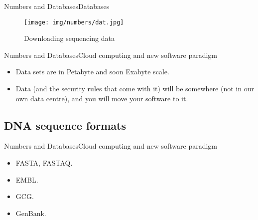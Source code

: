 \documentclass[10pt]{beamer}
\newcommand{\1}{
	\setbeamertemplate{background}{
		\texttt{[image: img/1]}
		\tikz[overlay] \fill[fill opacity=0.75,fill=white] (0,0) rectangle (-\paperwidth,\paperheight);
	}
}
\begin{document}
\begin{frame}{Numbers and Databases}{Databases}
\begin{figure}[]
 \centering
    \texttt{[image: img/numbers/dat.jpg]}
    \label{img:mot2}
    \caption{Downloading sequencing data}
\end{figure}
\end{frame}

\begin{frame}{Numbers and Databases}{Cloud computing and new software paradigm}
\begin{itemize}
\item Data sets are in Petabyte and soon Exabyte scale.
\item Data (and the security rules that come with it) will be somewhere (not in our own data centre), and you will move your software to it.
\end{itemize}
\end{frame}




\subsection{DNA sequence formats}

\begin{frame}{Numbers and Databases}{Cloud computing and new software paradigm}
\begin{itemize}
\item FASTA, FASTAQ.
\item EMBL.
\item GCG.
\item GenBank.
\end{itemize}
\end{frame}
\end{document}
